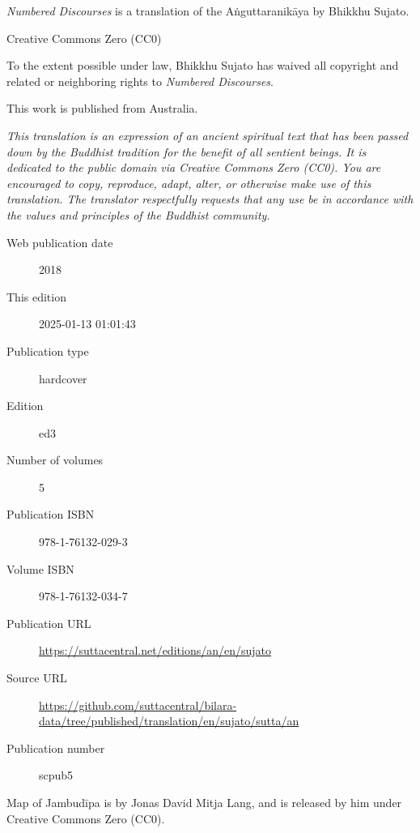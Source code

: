 \documentclass[12pt,openany]{book}%
\begin{document}
\begin{footnotesize}

\textit{Numbered Discourses} is a translation of the Aṅguttaranikāya by Bhikkhu Sujato.

\medskip

Creative Commons Zero (CC0)

To the extent possible under law, Bhikkhu Sujato has waived all copyright and related or neighboring rights to \textit{Numbered Discourses}.

\medskip

This work is published from Australia.

\begin{center}
\textit{This translation is an expression of an ancient spiritual text that has been passed down by the Buddhist tradition for the benefit of all sentient beings. It is dedicated to the public domain via Creative Commons Zero (CC0). You are encouraged to copy, reproduce, adapt, alter, or otherwise make use of this translation. The translator respectfully requests that any use be in accordance with the values and principles of the Buddhist community.}
\end{center}

\medskip

\begin{description}
    \item[Web publication date] 2018
    \item[This edition] 2025-01-13 01:01:43
    \item[Publication type] hardcover
    \item[Edition] ed3
    \item[Number of volumes] 5
    \item[Publication ISBN] 978-1-76132-029-3
    \item[Volume ISBN] 978-1-76132-034-7
    \item[Publication URL] \href{https://suttacentral.net/editions/an/en/sujato}{https://suttacentral.net/editions/an/en/sujato}
    \item[Source URL] \href{https://github.com/suttacentral/bilara-data/tree/published/translation/en/sujato/sutta/an}{https://github.com/suttacentral/bilara-data/tree/published/translation/en/sujato/sutta/an}
    \item[Publication number] scpub5
\end{description}

\medskip

Map of Jambudīpa is by Jonas David Mitja Lang, and is released by him under Creative Commons Zero (CC0).


\end{footnotesize}
\end{document}
